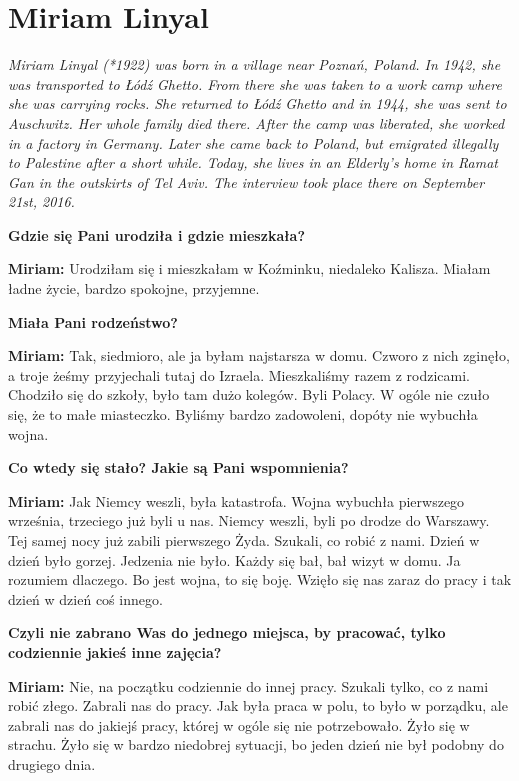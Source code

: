 \section{Miriam Linyal}
\begin{otherlanguage}{polish}
\textit{Miriam Linyal (*1922) was born in a village near Poznań, Poland. In 1942, she was transported to Łódź Ghetto. From there she was taken to a work camp where she was carrying rocks. She returned to Łódź Ghetto and in 1944, she was sent to Auschwitz. Her whole family died there. After the camp was liberated, she worked in a factory in Germany. Later she came back to Poland, but emigrated illegally to Palestine after a short while. Today, she lives in an Elderly’s home in Ramat Gan in the outskirts of Tel Aviv. The interview took place there on September 21st, 2016.}\par
\vspace*{2em}
\textbf{Gdzie się Pani urodziła i gdzie mieszkała?} 

\textbf{Miriam:} Urodziłam się i mieszkałam w Koźminku, niedaleko Kalisza. Miałam ładne życie, bardzo spokojne, przyjemne.

\textbf{Miała Pani rodzeństwo?} 

\textbf{Miriam:} Tak, siedmioro, ale ja byłam najstarsza w domu. Czworo z nich zginęło, a troje żeśmy przyjechali tutaj do Izraela. Mieszkaliśmy razem z rodzicami. Chodziło się do szkoły, było tam dużo kolegów. Byli Polacy. W ogóle nie czuło się, że to małe miasteczko. Byliśmy bardzo zadowoleni, dopóty nie wybuchła wojna.

\textbf{Co wtedy się stało? Jakie są Pani wspomnienia?} 

\textbf{Miriam:} Jak Niemcy weszli, była katastrofa. Wojna wybuchła pierwszego września, trzeciego już byli u nas. Niemcy weszli, byli po drodze do Warszawy. Tej samej nocy już zabili pierwszego Żyda. Szukali, co robić z nami. Dzień w dzień było gorzej. Jedzenia nie było. Każdy się bał, bał wizyt w domu. Ja rozumiem dlaczego. Bo jest wojna, to się boję. Wzięło się nas zaraz do pracy i tak dzień w dzień coś innego.

\textbf{Czyli nie zabrano Was do jednego miejsca, by pracować, tylko codziennie jakieś inne zajęcia?} 

\textbf{Miriam:} Nie, na początku codziennie do innej pracy. Szukali tylko, co z nami robić złego. Zabrali nas do pracy. Jak była praca w polu, to było w porządku, ale zabrali nas do jakiejś pracy, której w ogóle się nie potrzebowało. Żyło się w strachu. Żyło się w bardzo niedobrej sytuacji, bo jeden dzień nie był podobny do drugiego dnia. 


\end{otherlanguage}
